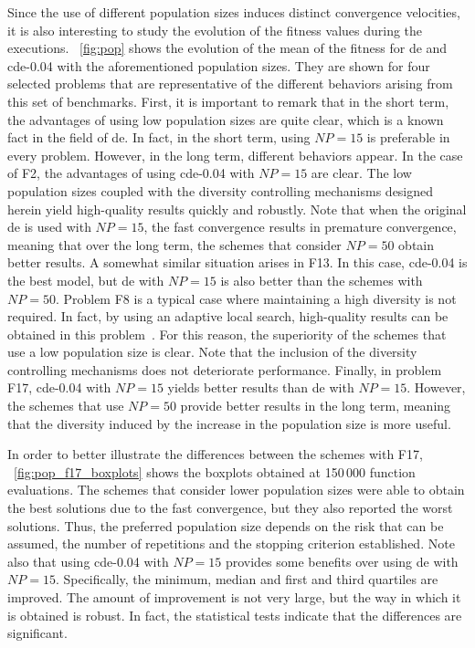 \documentclass[review,3p]{elsarticle}
\newcommand{\CDE}{c{\sc de}}
\newcommand{\DE}{{\sc de}}
\begin{document}
Since the use of different population sizes induces distinct convergence velocities, it is also interesting to study 
the evolution of the fitness values during the executions.
%
\figurename~\ref{fig:pop} shows the evolution of the mean of the fitness for \DE{} and \CDE{}-0.04 with the aforementioned population sizes.
%
They are shown for four selected problems that are representative of the different behaviors arising from this set of benchmarks.
%
First, it is important to remark that in the short term, the advantages of using low population sizes are quite clear, which is a known
fact in the field of \DE{}.
%
In fact, in the short term, using $NP = 15$ is preferable in every problem.
%
However, in the long term, different behaviors appear.
%
In the case of F2, the advantages of using \CDE{}-0.04 with $NP = 15$ are clear.
%
The low population sizes coupled with the diversity controlling mechanisms designed herein yield high-quality results quickly and robustly.
%
Note that when the original \DE{} is used with $NP = 15$, the fast convergence results in premature convergence, meaning that over the long term, the schemes
that consider $NP = 50$ obtain better results.
%
A somewhat similar situation arises in F13.
%
In this case, \CDE{}-0.04 is the best model, but \DE{} with $NP = 15$ is also better than the schemes with $NP = 50$.
%
Problem F8 is a typical case where maintaining a high diversity is not required.
%
In fact, by using an adaptive local search, high-quality results can be obtained in this problem~\cite{LaTorre:11}.
%
For this reason, the superiority of the schemes that use a low population size is clear.
%
Note that the inclusion of the diversity controlling mechanisms does not deteriorate performance.
%
Finally, in problem F17, \CDE{}-0.04 with $NP = 15$ yields better results than \DE{} with $NP = 15$.
%
However, the schemes that use $NP = 50$ provide better results in the long term, meaning that the diversity
induced by the increase in the population size is more useful.


In order to better illustrate the differences between the schemes with F17, \figurename~\ref{fig:pop_f17_boxplots}
shows the boxplots obtained at 150$\,$000 function evaluations.
%
The schemes that consider lower population sizes were able to obtain the best solutions due to the fast convergence,
but they also reported the worst solutions.
%
Thus, the preferred population size depends on the risk that can be assumed, the number of repetitions and the stopping criterion established.
%
Note also that using \CDE{}-0.04 with $NP = 15$ provides some benefits over using \DE{} with $NP=15$.
%
Specifically, the minimum, median and first and third quartiles are improved.
%
The amount of improvement is not very large, but the way in which it is obtained is robust.
%
In fact, the statistical tests indicate that the differences are significant.
%
\end{document}
